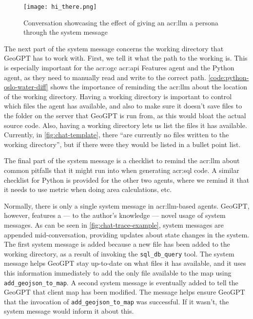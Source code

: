 \begin{figure}[h]
    \centering
    \texttt{[image: hi\_there.png]}
    \caption{Conversation showcasing the effect of giving an \acrshort{acr:llm} a persona through the system message}
    \label{fig:effect-of-system-message}
\end{figure}

The next part of the system message concerns the working directory that GeoGPT has to work with. First, we tell it what the path to the working is. This is especially important for the \acrshort{acr:ogc} \acrshort{acr:api} Features agent and the Python agent, as they need to manually read and write to the correct path. \autoref{code:python-oslo-water-diff} shows the importance of reminding the \acrshort{acr:llm} about the location of the working directory. Having a working directory is important to control which files the agent has available, and also to make sure it doesn't save files to the folder on the server that GeoGPT is run from, as this would bloat the actual source code. Also, having a working directory lets us list the files it has available. Currently, in \autoref{fig:chat-template}, there \enquote{are currently no files written to the working directory}, but if there were they would be listed in a bullet point list.

The final part of the system message is a checklist to remind the \acrshort{acr:llm} about common pitfalls that it might run into when generating \acrshort{acr:sql} code. A similar checklist for Python is provided for the other two agents, where we remind it that it needs to use metric  when doing area calculations, etc.

Normally, there is only a single system message in \acrshort{acr:llm}-based agents. GeoGPT, however, features a --- to the author's knowledge --- novel usage of system messages. As can be seen in \autoref{fig:chat-trace-example}, system messages are appended mid-conversation, providing updates about state changes in the system. The first system message is added because a new file has been added to the working directory, as a result of invoking the \texttt{sql\_db\_query} tool. The system message helps GeoGPT stay up-to-date on what files it has available, and it uses this information immediately to add the only file available to the map using \texttt{add\_geojson\_to\_map}. A second system message is eventually added to tell the GeoGPT that client map has been modified. The message helps ensure GeoGPT that the invocation of \texttt{add\_geojson\_to\_map} was successful. If it wasn't, the system message would inform it about this.

\glsresetall


